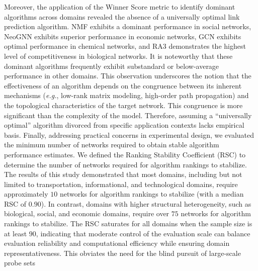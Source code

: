 \documentclass{article}
\begin{document}
Moreover, the application of the Winner Score metric to identify dominant algorithms across domains revealed the absence of a universally optimal link prediction algorithm. NMF exhibits a dominant performance in social networks, NeoGNN exhibits superior performance in economic networks, GCN exhibits optimal performance in chemical networks, and RA3 demonstrates the highest level of competitiveness in biological networks. It is noteworthy that these dominant algorithms frequently exhibit substandard or below-average performance in other domains. This observation underscores the notion that the effectiveness of an algorithm depends on the congruence between its inherent mechanisms (\textit{e.g.}, low-rank matrix modeling, high-order path propagation) and the topological characteristics of the target network. This congruence is more significant than the complexity of the model. Therefore, assuming a ``universally optimal'' algorithm divorced from specific application contexts lacks empirical basis. Finally, addressing practical concerns in experimental design, we evaluated the minimum number of networks required to obtain stable algorithm performance estimates. We defined the Ranking Stability Coefficient (RSC) to determine the number of networks required for algorithm rankings to stabilize. The results of this study demonstrated that most domains, including but not limited to transportation, informational, and technological domains, require approximately $10$ networks for algorithm rankings to stabilize (with a median RSC of $0.90$). In contrast, domains with higher structural heterogeneity, such as biological, social, and economic domains, require over $75$ networks for algorithm rankings to stabilize. The RSC saturates for all domains when the sample size is at least $90$, indicating that moderate control of the evaluation scale can balance evaluation reliability and computational efficiency while ensuring domain representativeness. This obviates the need for the blind pursuit of large-scale probe sets
	
\end{document}
